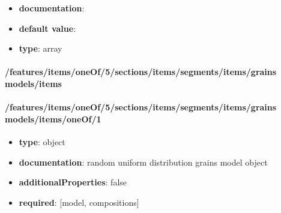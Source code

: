 \begin{itemize}\item {\bf documentation}: 
\item {\bf default value}: 
\item {\bf type}: array
\end{itemize}\paragraph{/features/items/oneOf/5/sections/items/segments/items/grains models/items}

\paragraph{/features/items/oneOf/5/sections/items/segments/items/grains models/items/oneOf/1}
\begin{itemize}\item {\bf type}: object
\item {\bf documentation}: random uniform distribution grains model object
\item {\bf additionalProperties}: false
\item {\bf required}: [model, compositions]\end{itemize}
